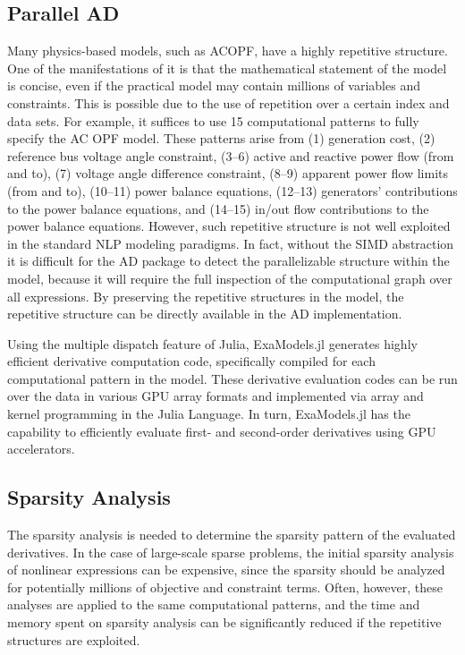 \documentclass{IEEEtran4PSCC} %
\begin{document}
\subsection{Parallel AD}
\label{sec:simd:ad}
Many physics-based models, such as ACOPF, have a highly repetitive
structure. One of the manifestations of it is that the mathematical
statement of the model is concise, even if the practical model may contain
millions of variables and constraints. This is possible due to the use of
repetition over a certain index and data sets. For example,
it suffices to use 15 computational patterns to fully specify the
AC OPF model. These patterns arise from (1) generation cost, (2) reference
bus voltage angle constraint, (3--6) active and reactive power flow (from and to),
(7) voltage angle difference constraint, (8--9) apparent
power flow limits (from and to), (10--11) power balance equations,
(12--13) generators' contributions to the power balance equations, and
(14--15) in/out flow contributions to the power balance
equations. However, such repetitive structure is not well exploited in
the standard NLP modeling paradigms. In fact, without the SIMD
abstraction it is difficult for the AD package to detect the
parallelizable structure within the model, because it will require the full
inspection of the computational graph over all expressions.  By
preserving the repetitive structures in the model, the repetitive
structure can be directly available in the AD implementation.

Using the multiple dispatch feature of Julia, ExaModels.jl generates
highly efficient derivative computation code, specifically compiled
for each computational pattern in the model. These derivative evaluation codes can be run over the data in various GPU array formats
and implemented via array and kernel programming in the Julia Language. In
turn, ExaModels.jl has the capability to efficiently evaluate first- and
second-order derivatives using GPU accelerators.

\subsection{Sparsity Analysis}
The sparsity analysis is needed to determine the sparsity pattern
of the evaluated derivatives. In the case of large-scale sparse
problems, the initial sparsity analysis of nonlinear expressions can
be expensive, since the sparsity should be analyzed for potentially
millions of objective and constraint terms. Often, however, 
these analyses are applied to the same computational patterns, and
the time and memory spent on sparsity analysis can be significantly
reduced if the repetitive structures are exploited.
\end{document}

